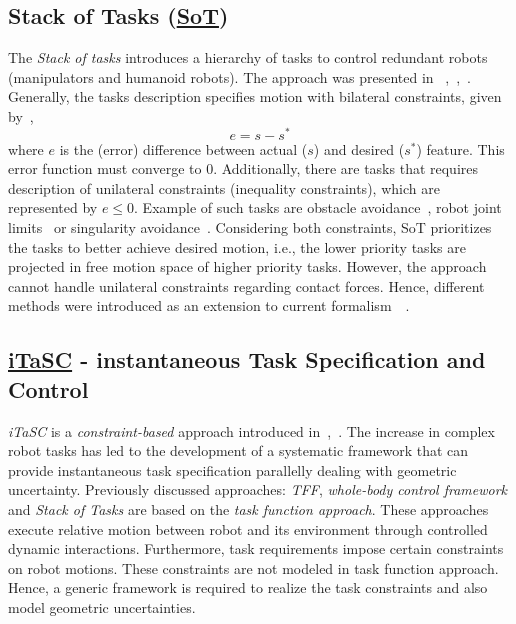 \subsection{Stack of Tasks (\hyperref[sot]{SoT})}
The \textit{Stack of tasks} introduces a hierarchy of tasks to control redundant robots (manipulators and humanoid robots). The approach was presented in ~\cite{mansard2009versatile},~\cite{mansard2009unified},~\cite{ramos2011dynamic}. Generally, the tasks description specifies motion with bilateral constraints, given by~\cite{mansard2009unified}, 
\begin{equation}
	e = s - s^*
\end{equation}
where $e$ is the (error) difference between actual ($s$) and desired ($s^*$) feature. This error function must converge to 0. Additionally, there are tasks that requires description of unilateral constraints (inequality constraints), which are represented by $e \leq 0$. Example of such tasks are obstacle avoidance~\cite{marchand1998dynamic}, robot joint limits~\cite{chaumette2001redundancy} or singularity avoidance~\cite{padois2007kinematic}. Considering both constraints, SoT prioritizes the tasks to better achieve desired motion, i.e., the lower priority tasks are projected in free motion space of higher priority tasks. However, the approach cannot handle unilateral constraints regarding contact forces. Hence, different methods were introduced as an extension to current formalism~\cite{saab2011generic}~\cite{saab2013dynamic}. 

\subsection{\hyperref[itasc]{iTaSC} - instantaneous Task Specification and Control}

\textit{iTaSC} is a \textit{constraint-based} approach introduced in~\cite{de2007constraint},~\cite{smits2009itasc}. The increase in complex robot tasks has led to the development of a systematic framework that can provide instantaneous task specification parallelly dealing with geometric uncertainty. Previously discussed approaches: \textit{TFF}, \textit{whole-body control framework} and \textit{Stack of Tasks} are based on the \textit{task function approach}. These approaches execute relative motion between robot and its environment through controlled dynamic interactions. Furthermore, task requirements impose certain constraints on robot motions. These constraints are not modeled in task function approach. Hence, a generic framework is required to realize the task constraints and also model geometric uncertainties. 


